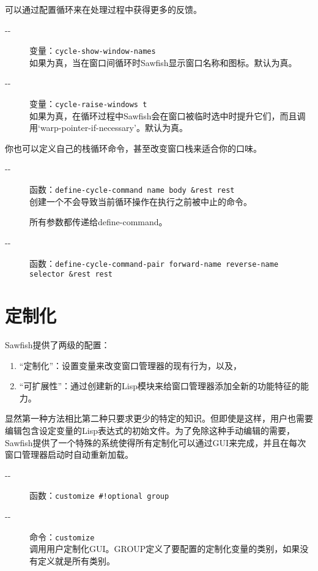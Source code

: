 \documentclass{book}
\begin{document}
\begin{CJK*}{UTF8}{gbsn}
可以通过配置循环来在处理过程中获得更多的反馈。
\begin{description}
\item[-{}-] 变量：\verb|cycle-show-window-names|\\
如果为真，当在窗口间循环时Sawfish显示窗口名称和图标。默认为真。
\item[-{}-] 变量：\verb|cycle-raise-windows t|\\
如果为真，在循环过程中Sawfish会在窗口被临时选中时提升它们，而且调用`warp-pointer-if-necessary'。默认为真。
\end{description}

你也可以定义自己的栈循环命令，甚至改变窗口栈来适合你的口味。
\begin{description}
\item[-{}-] 函数：\verb|define-cycle-command name body &rest rest|\\
创建一个不会导致当前循环操作在执行之前被中止的命令。

所有参数都传递给define-command。
\item[-{}-] 函数：\verb|define-cycle-command-pair forward-name reverse-name selector &rest rest|\\

\end{description}

\chapter{定制化}
Sawfish提供了两级的配置：
\begin{enumerate}
\item ``定制化''：设置变量来改变窗口管理器的现有行为，以及，
\item ``可扩展性''：通过创建新的Lisp模块来给窗口管理器添加全新的功能特征的能力。
\end{enumerate}

显然第一种方法相比第二种只要求更少的特定的知识。但即使是这样，用户也需要编辑包含设定变量的Lisp表达式的初始文件。为了免除这种手动编辑的需要，Sawfish提供了一个特殊的系统使得所有定制化可以通过GUI来完成，并且在每次窗口管理器启动时自动重新加载。
\begin{description}
\item[-{}-] 函数：\verb|customize #!optional group|
\item[-{}-] 命令：\verb|customize|\\
调用用户定制化GUI。GROUP定义了要配置的定制化变量的类别，如果没有定义就是所有类别。
\end{description}


\end{CJK*}
\end{document}
